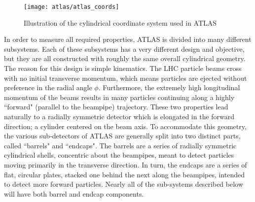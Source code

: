     \begin{figure}
        \texttt{[image: atlas/atlas\_coords]}
        \caption{Illustration of the cylindrical coordinate system used in ATLAS \cite{Schott:1699952}}
        \label{fig:atlas_coords}
    \end{figure}

    In order to measure all required properties, ATLAS is divided into many different subsystems.
    Each of these subsystems has a very different design and objective, but they are all constructed with roughly the same overall cylindrical geometry.
    The reason for this design is simple kinematics.
    The LHC particle beams cross with no initial transverse momentum, which means particles are ejected without preference in the radial angle $\phi$.
    Furthermore, the extremely high longitudinal momentum of the beams results in many particles continuing along a highly ``forward" (parallel to the beampipe) trajectory.
    These two properties lead naturally to a radially symmetric detector which is elongated in the forward direction; a cylinder centered on the beam axis.
    To accommodate this geometry, the various sub-detectors of ATLAS are generally split into two distinct parts, called ``barrels" and ``endcaps".
    The barrels are a series of radially symmetric cylindrical shells, concentric about the beampipes, meant to detect particles moving primarily in the transverse direction.
    In turn, the endcaps are a series of flat, circular plates, stacked one behind the next along the beampipes, intended to detect more forward particles.
    Nearly all of the sub-systems described below will have both barrel and endcap components.

